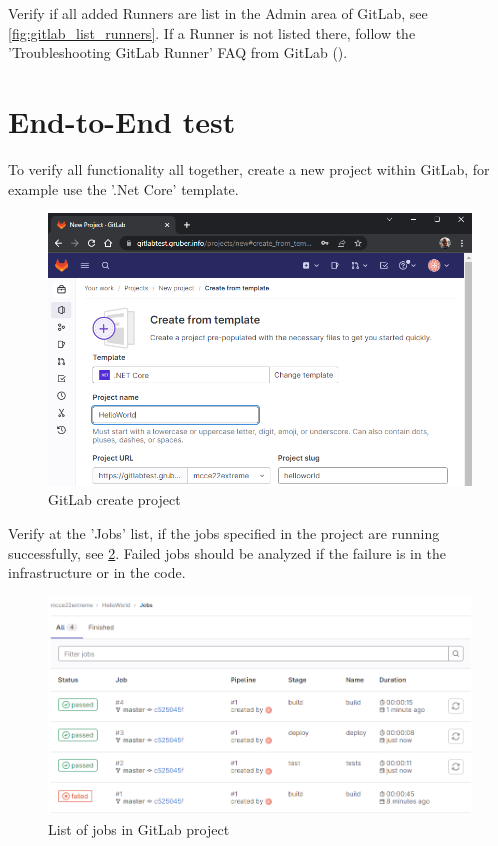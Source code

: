 Verify if all added Runners are list in the Admin area of GitLab, see \ref{fig:gitlab_list_runners}.
If a Runner is not listed there, follow the 'Troubleshooting GitLab Runner' FAQ from GitLab (\cite{refGitLabRunnersTroubleshooting}).

\section{End-to-End test}

To verify all functionality all together, create a new project within GitLab, for example use the '.Net Core' template.
\begin{figure}[H]
	\centering
	\includegraphics[width=14cm]{images/gitlab_create_project.png}
	\caption{GitLab create project}
	\label{fig:gitlab_create_project}
\end{figure}

Verify at the 'Jobs' list, if the jobs specified in the project are running successfully, see \ref{fig:gitlab_jobs_list}.
Failed jobs should be analyzed if the failure is in the infrastructure or in the code.
\begin{figure}[H]
	\centering
	\includegraphics[width=14cm]{images/gitlab_jobs_list.png}
	\caption{List of jobs in GitLab project}
	\label{fig:gitlab_jobs_list}
\end{figure}